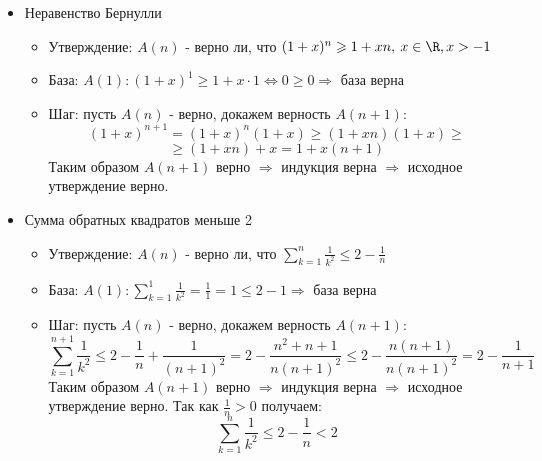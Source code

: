 \begin{itemize}
		\item Неравенство Бернулли
		\begin{itemize}
			\item Утверждение: $A(n)$ - верно ли, что $(1 + x)^n \geqslant 1 + xn, \: x \in \R, x > -1$
			\item База: $A(1) \colon (1 + x)^1 \geqslant 1 + x\cdot1 \Leftrightarrow 0 \geqslant 0 \Rightarrow$ база верна
			\item Шаг: пусть $A(n)$ - верно, докажем верность $A(n + 1)$:
			$$(1 + x)^{n + 1} = (1 + x)^n(1 + x) \geqslant (1 + xn)(1 + x)\geqslant$$$$ \geqslant (1 + xn) + x = 1 + x(n + 1)$$
			Таким образом $A(n + 1)$ верно $\Rightarrow$ индукция верна $\Rightarrow$ исходное утверждение верно.
		\end{itemize}
		\item Сумма обратных квадратов меньше 2
		\begin{itemize}
			\item Утверждение: $A(n)$ - верно ли, что $\displaystyle\sum_{k=1}^{n} \frac{1}{k^2} \leqslant 2 - \frac{1}{n}$
			\item База: $A(1)\colon \displaystyle\sum_{k=1}^{1}\frac{1}{k^2} = \frac{1}{1} = 1 \leqslant 2 - 1 \Rightarrow$ база верна
			\item Шаг: пусть $A(n)$ - верно, докажем верность $A(n + 1)$:
			$$\displaystyle\sum_{k=1}^{n+1} \frac{1}{k^2}  \leqslant 2 - \frac{1}{n} + \frac{1}{(n+1)^2} = 2 - \frac{n^2 + n + 1}{n(n + 1)^2} \leqslant 2 - \frac{n(n + 1)}{n(n+1)^2} = 2 - \frac{1}{n+1}$$
			Таким образом $A(n + 1)$ верно $\Rightarrow$ индукция верна $\Rightarrow$ исходное утверждение верно. Так как $\frac{1}{n} > 0$ получаем:
			$$\displaystyle\sum_{k=1}^{n} \frac{1}{k^2} \leqslant 2 - \frac{1}{n} < 2$$
		\end{itemize} 
	\end{itemize}
